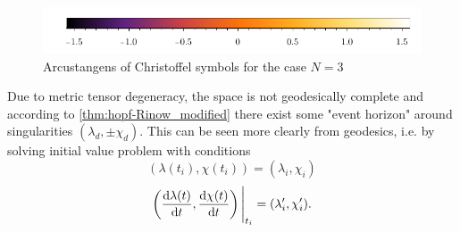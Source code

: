 \begin{figure}
\begin{tabular}{cc}
    \end{tabular}
\includegraphics{../img/N=3_barA.pdf}
    \caption{Arcustangens of Christoffel symbols for the case $N=3$}
    \label{fig:N=3_G}
\end{figure}

Due to metric tensor degeneracy, the space is not geodesically complete and according to \ref{thm:hopf-Rinow_modified} there exist some "event horizon" around singularities $(\lambda_d,\pm \chi_d)$. This can be seen more clearly from geodesics, i.e. by solving initial value problem with conditions
$$(\lambda(t_i),\chi(t_i))=(\lambda_i,\chi_i)$$
$$\left(\frac{\mathrm{d} \lambda(t)}{\mathrm{d} t},\frac{\mathrm{d} \chi(t)}{\mathrm{d} t}\right)\Bigg|_{t_i}=(\lambda'_i,\chi'_i).$$
